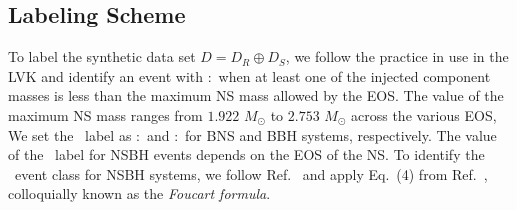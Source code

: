 \subsection{Labeling Scheme}


To label the synthetic data set $D=D_R\oplus D_S$, we follow the practice in use in the \ac{LVK} and identify an event with \hasns:\true\ when at least one of the injected component masses is less
than the maximum \ac{NS} mass allowed by the \ac{EOS}. The value of the maximum \ac{NS} mass ranges from $1.922$ $M_{\odot}$ to $2.753$ $M_{\odot}$ across the various \ac{EOS}, %
 We set the \hasrem\ label as \hasrem:\true\ and \hasrem:\false\ for
\ac{BNS} and \ac{BBH} systems, respectively. The value of the \hasrem\ label for \ac{NSBH} events depends on the \ac{EOS} of the \ac{NS}. To identify the \hasrem\ event class for \ac{NSBH} systems, 
we follow Ref.~\cite{Chatterjee:2019avs} and apply Eq.~(4) from Ref.~\cite{Foucart:2018rjc}, colloquially known as the \emph{Foucart formula}.

